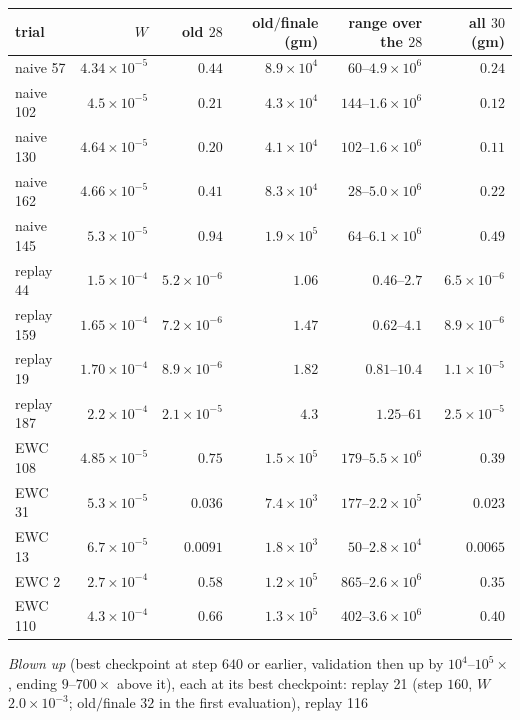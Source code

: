 \documentclass[11pt]{article}
\begin{document}
\begin{center}\small
\begin{tabular}{lrrrrr}
\toprule
trial & $W$ & old $28$ & old$/$finale (gm) & range over the $28$ & all $30$ (gm) \\
\midrule
naive 57 & $4.34\times10^{-5}$ & $0.44$ & $8.9\times10^{4}$ & $60$--$4.9\times10^{6}$ & $0.24$ \\
naive 102 & $4.5\times10^{-5}$ & $0.21$ & $4.3\times10^{4}$ & $144$--$1.6\times10^{6}$ & $0.12$ \\
naive 130 & $4.64\times10^{-5}$ & $0.20$ & $4.1\times10^{4}$ & $102$--$1.6\times10^{6}$ & $0.11$ \\
naive 162 & $4.66\times10^{-5}$ & $0.41$ & $8.3\times10^{4}$ & $28$--$5.0\times10^{6}$ & $0.22$ \\
naive 145 & $5.3\times10^{-5}$ & $0.94$ & $1.9\times10^{5}$ & $64$--$6.1\times10^{6}$ & $0.49$ \\
replay 44 & $1.5\times10^{-4}$ & $5.2\times10^{-6}$ & $1.06$ & $0.46$--$2.7$ & $6.5\times10^{-6}$ \\
replay 159 & $1.65\times10^{-4}$ & $7.2\times10^{-6}$ & $1.47$ & $0.62$--$4.1$ & $8.9\times10^{-6}$ \\
replay 19 & $1.70\times10^{-4}$ & $8.9\times10^{-6}$ & $1.82$ & $0.81$--$10.4$ & $1.1\times10^{-5}$ \\
replay 187 & $2.2\times10^{-4}$ & $2.1\times10^{-5}$ & $4.3$ & $1.25$--$61$ & $2.5\times10^{-5}$ \\
EWC 108 & $4.85\times10^{-5}$ & $0.75$ & $1.5\times10^{5}$ & $179$--$5.5\times10^{6}$ & $0.39$ \\
EWC 31 & $5.3\times10^{-5}$ & $0.036$ & $7.4\times10^{3}$ & $177$--$2.2\times10^{5}$ & $0.023$ \\
EWC 13 & $6.7\times10^{-5}$ & $0.0091$ & $1.8\times10^{3}$ & $50$--$2.8\times10^{4}$ & $0.0065$ \\
EWC 2 & $2.7\times10^{-4}$ & $0.58$ & $1.2\times10^{5}$ & $865$--$2.6\times10^{6}$ & $0.35$ \\
EWC 110 & $4.3\times10^{-4}$ & $0.66$ & $1.3\times10^{5}$ & $402$--$3.6\times10^{6}$ & $0.40$ \\
\bottomrule
\end{tabular}
\end{center}
\emph{Blown up} (best checkpoint at step $640$ or earlier, validation then up by $10^4$--$10^5\times$, ending $9$--$700\times$ above it), each at its best
checkpoint: replay 21 (step $160$, $W$ $2.0\times10^{-3}$; old$/$finale $32$ in the first evaluation), replay 116
\end{document}
